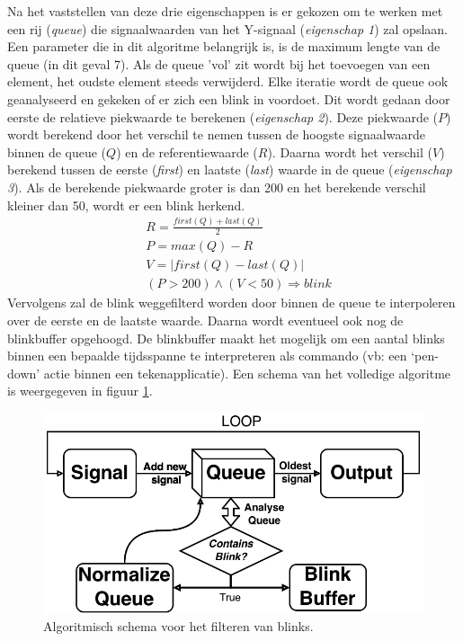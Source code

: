 \documentclass{article}
\newcommand{\figwidth}{0.75\linewidth}
\begin{document}
Na het vaststellen van deze drie eigenschappen is er gekozen om te werken met een rij (\textit{queue}) die signaalwaarden van het Y-signaal (\textit{eigenschap 1}) zal opslaan. Een parameter die in dit algoritme belangrijk is, is de maximum lengte van de queue (in dit geval 7). Als de queue 'vol' zit wordt bij het toevoegen van een element, het oudste element steeds verwijderd. Elke iteratie wordt de queue ook geanalyseerd en gekeken of er zich een blink in voordoet. Dit wordt gedaan door eerste de relatieve piekwaarde te berekenen (\textit{eigenschap 2}). Deze piekwaarde ($P$) wordt berekend door het verschil te nemen tussen de hoogste signaalwaarde binnen de queue ($Q$) en de referentiewaarde ($R$). Daarna wordt het verschil ($V$) berekend tussen de eerste (\textit{first}) en laatste (\textit{last}) waarde in de queue (\textit{eigenschap 3}). Als de berekende piekwaarde groter is
dan 200 en het berekende verschil kleiner dan 50, wordt er een blink herkend.
\begin{align*}
&R = \frac{first(Q) + last(Q)}{2}\\
&P = max(Q) - R\\
&V = |first(Q)-last(Q)|\\
&(P>200) \wedge (V < 50) \Rightarrow blink
\end{align*} 
Vervolgens zal de blink weggefilterd worden door binnen de queue te interpoleren over de eerste en de laatste waarde. Daarna wordt eventueel ook nog de blinkbuffer opgehoogd. De blinkbuffer maakt het mogelijk om een aantal blinks binnen een bepaalde tijdsspanne te interpreteren als commando (vb: een ‘pen-down’ actie binnen een tekenapplicatie). Een schema van het volledige algoritme is weergegeven in figuur \ref{fig:algoblinkfilter}.

\begin{figure}[H]
	\centering
	\includegraphics[width = \figwidth]{images/blinkfilterbw}
	\caption{Algoritmisch schema voor het filteren van blinks.}
	\label{fig:algoblinkfilter}
\end{figure}
\end{document}
